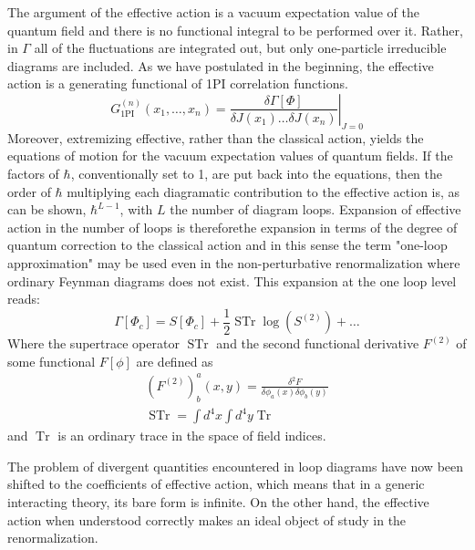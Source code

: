 \documentclass[11pt, a4paper]{article}
\begin{document}
The argument of the effective action is a vacuum expectation value of the quantum field and there is no functional integral to be performed over it.
Rather, in $\Gamma$ all of the fluctuations are integrated out, but only one-particle irreducible diagrams
are included. 
As we have postulated in the beginning, the effective action is a generating functional of 1PI correlation functions.
\begin{equation}
    G_{\text{1PI}}^{(n)}(x_1,\dots,x_n) = \left.\frac{\delta \Gamma[\Phi]}{\delta J(x_1) \dots \delta J(x_n)}\right|_{J=0}
\end{equation}
Moreover, extremizing effective, rather than the classical action, yields the equations of motion for the vacuum expectation values of quantum fields.
If the factors of $\hbar$, conventionally set to 1, are put back into the equations, then the order of $\hbar$ multiplying each diagramatic contribution to the effective action is, as can be shown, $\hbar^{L-1}$, with $L$ the number of diagram loops. Expansion of effective action in the number of loops is thereforethe expansion in terms of the degree of quantum correction to the classical action and in this sense the term "one-loop approximation" may be used even in the non-perturbative renormalization where ordinary Feynman diagrams does not exist.
This expansion at the one loop level reads:
\begin{equation}
    \Gamma[\Phi_c] = S[\Phi_c] + \frac{1}{2} \operatorname{STr} \operatorname{log} \left( S^{(2)}\right) + \dots
\end{equation}
Where the supertrace operator $ \operatorname{STr}$ and the second functional derivative $F^{(2)}$ of some functional $F[\phi]$ are defined as
\begin{gather}
    (F^{(2)})^a_b(x,y) = \frac{\delta^2 F}{\delta\phi_a(x)\delta\phi_b(y)}\\
    \operatorname{STr} = \int d^4 x \int d^4 y \operatorname{Tr}
\end{gather}
and $\operatorname{Tr}$ is an ordinary trace in the space of field indices.


The problem of divergent quantities encountered in loop diagrams have now been shifted to the coefficients of effective action, which means that in a generic interacting theory, its bare form is infinite. On the other hand, the effective action when understood correctly makes an ideal object of study in the renormalization.


\end{document}

